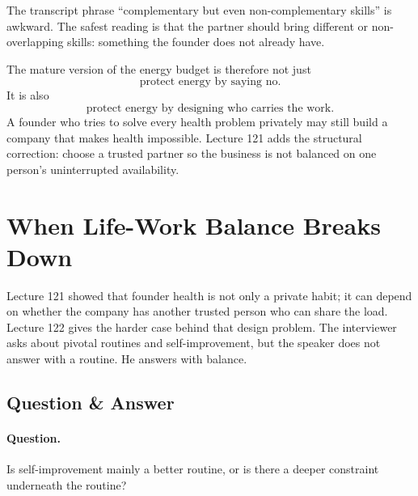 \documentclass[11pt,oneside]{book}
\begin{document}
\begin{remark}
The transcript phrase ``complementary but even non-complementary skills'' is awkward. The safest reading is that the partner should bring different or non-overlapping skills: something the founder does not already have.
\end{remark}

The mature version of the energy budget is therefore not just
\[
\text{protect energy by saying no}.
\]
It is also
\[
\text{protect energy by designing who carries the work}.
\]
A founder who tries to solve every health problem privately may still build a company that makes health impossible. Lecture 121 adds the structural correction: choose a trusted partner so the business is not balanced on one person's uninterrupted availability.


\section{When Life-Work Balance Breaks Down}

Lecture 121 showed that founder health is not only a private habit; it can depend on whether the company has another trusted person who can share the load. Lecture 122 gives the harder case behind that design problem. The interviewer asks about pivotal routines and self-improvement, but the speaker does not answer with a routine. He answers with balance.

\subsection{Question \& Answer}

\paragraph{Question.}
Is self-improvement mainly a better routine, or is there a deeper constraint underneath the routine?
\end{document}
